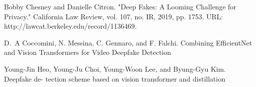 \documentclass[conference]{IEEEtran}
\begin{document}
		
		
		
		
		
		
		
		
		
		
		\begin{thebibliography}{1}
			
			
			Bobby Chesney and Danielle Citron. "Deep Fakes: A Looming Challenge for Privacy." California Law Review, vol. 107, no. IR, 2019, pp. 1753. URL: http://lawcat.berkeley.edu/record/1136469.
			
			D.~A Coccomini, N. Messina, C. Gennaro, and F. Falchi. Combining EfficientNet and Vision Transformers for Video Deepfake Detection
			
			
			Young-Jin Heo, Young-Ju Choi, Young-Woon Lee, and Byung-Gyu Kim. Deepfake de-
			tection scheme based on vision transformer and distillation
			
		\end{thebibliography}
%		


		
		
		
		
	
\end{document}
